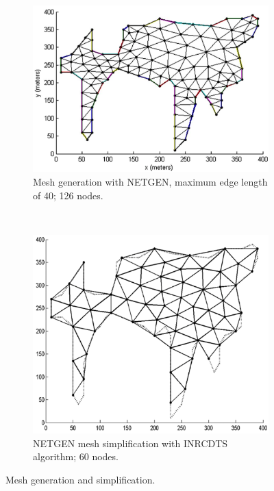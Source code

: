 \documentclass[authoryearcitations]{UoYCSproject}
\begin{document}
\begin{figure}
 \centering
    \begin{subfigure}[t]{.48\textwidth}
        \includegraphics[width=\textwidth]{figures/netgen.png}
        \caption{Mesh generation with NETGEN, maximum edge length of 40; 126 nodes.}
        \label{fig:netgen}
    \end{subfigure}
    ~
    \begin{subfigure}[t]{.48\textwidth}
        \includegraphics[width=\textwidth]{figures/netgen-inrcdts.png}
        \caption{NETGEN mesh simplification with INRCDTS algorithm; 60 nodes.}
        \label{fig:inrcdts}
    \end{subfigure}
 \caption{Mesh generation and simplification.}
 \label{fig:netgen-inrcdts}
\end{figure}
\end{document}
